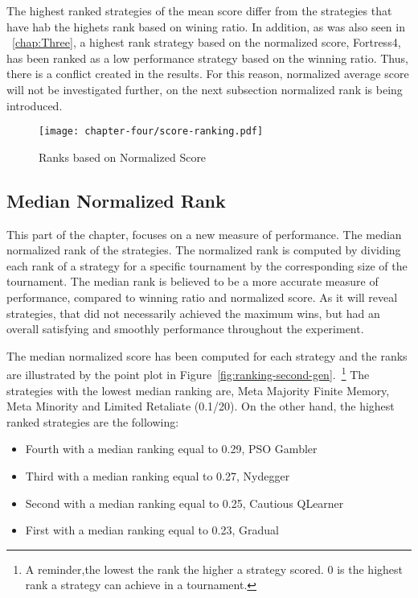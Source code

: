 The highest ranked strategies of the mean score differ from the strategies that
have hab the highets rank based on wining ratio. In addition, as was also seen
in ~\autoref{chap:Three}, a highest rank strategy based on the normalized score,
Fortress4, has been ranked as a low performance strategy based on the winning ratio.
Thus, there is a conflict created in the results. For this reason, normalized
average score will not be investigated further, on the next subsection normalized
rank is being introduced.

\begin{figure}[H]
	\texttt{[image: chapter-four/score-ranking.pdf]}
	\caption{Ranks based on Normalized Score}
	\label{fig:wining-second-gen}
\end{figure}

\subsection{Median Normalized Rank}

This part of the chapter, focuses on a new measure of performance. The
median normalized rank of the strategies. The normalized rank is computed
by dividing each rank of a strategy for a specific tournament by the corresponding
size of the tournament. The median rank is believed to be a more accurate
measure of performance, compared to winning ratio and normalized score.
As it will reveal strategies, that did not necessarily achieved the maximum wins,
but had an overall satisfying and smoothly performance throughout the experiment.

The median normalized score has been computed for each strategy and the ranks
are illustrated by the point plot in Figure~\ref{fig:ranking-second-gen}.~\footnote{A reminder,the
	lowest the rank the higher a strategy scored. 0 is the highest rank a strategy
can achieve in a tournament.} The strategies with the lowest median ranking are,
Meta Majority Finite Memory, Meta Minority and Limited Retaliate (0.1/20).
On the other hand, the highest ranked strategies are the following:

\begin{itemize}
	\item Fourth with a median ranking equal to 0.29, PSO Gambler
	\item Third with a median ranking equal to 0.27, Nydegger
	\item Second with a median ranking equal to 0.25, Cautious QLearner
	\item First with a median ranking equal to 0.23, Gradual
\end{itemize}

